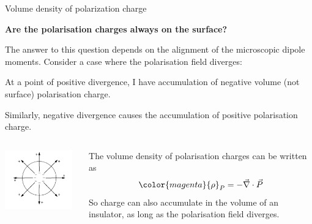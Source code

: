 \begin{frame}{Volume density of polarization charge}

{\bf Are the polarisation charges always on the surface?}\\
\vspace{0.1cm}

The answer to this question depends on the alignment of the microscopic dipole moments.
Consider a case where the polarisation field diverges:
\begin{itemize}
{\small
  \item At a point of positive divergence, I have accumulation of negative volume
        (not surface) polarisation charge.
  \item Similarly, negative divergence causes the accumulation of positive polarisation charge.
}
\end{itemize}

\begin{columns}
  \begin{column}{0.35\textwidth}
   \begin{center}
     \includegraphics[width=0.95\textwidth]{./images/schematics/divergent_polarization.png}\\
   \end{center}
  \end{column}
  \begin{column}{0.65\textwidth}
     The volume density of polarisation charges can be written as
     \begin{equation*}
       {\color{magenta} {\rho}_P = - \vec{\nabla} \cdot \vec{P}}
     \end{equation*}
     So charge can also accumulate in the volume of an insulator,
     as long as the polarisation field diverges.
  \end{column}
\end{columns}

\end{frame}

